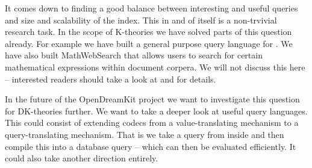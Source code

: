 It comes down to finding a good balance between interesting and useful queries and size
and scalability of the index. This in and of itself is a non-trvivial research task. In
the scope of K-theories we have solved parts of this question already. For example we have
built a general purpose query language for \MMT. We have also built MathWebSearch that
allows users to search for certain mathematical expressions within document corpera. We
will not discuss this here -- interested readers should take a look at \cite{Rabe:qlfml12}
and \cite{ODK-D6.1} for details.

In the future of the OpenDreamKit project we want to investigate this question for
DK-theories further. We want to take a deeper look at useful query languages. This could
consist of extending codecs from a value-translating mechanism to a query-translating
mechanism. That is we take a query from inside \MMT and then compile this into a database
query -- which can then be evaluated efficiently. It could also take another direction
entirely.

